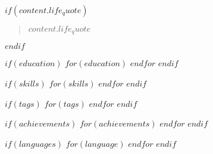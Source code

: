 
$if(content.life_quote)$
\begin{quote}
$content.life_quote$
\end{quote}
$endif$

$if(education)$
$for(education)$
$endfor$
$endif$

$if(skills)$
$for(skills)$
$endfor$
$endif$

$if(tags)$
$for(tags)$
$endfor$
$endif$

$if(achievements)$
$for(achievements)$
\divider
$endfor$
$endif$

$if(languages)$
$for(language)$
$endfor$
$endif$






